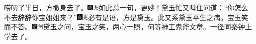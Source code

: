 唠叨了半日，方撤身去了。{\includegraphics[width=3mm]{../Images/00005}\includegraphics[width=3mm]{../Images/00012}\footnotesize \kaishu 如此总一句，更妙！}黛玉忙又叫住问道：“你怎么不去辞辞你宝姐姐来？”{\includegraphics[width=3mm]{../Images/00005}\includegraphics[width=3mm]{../Images/00012}\footnotesize \kaishu 必有是语，方是黛玉。此又系黛玉平生之病。}宝玉笑而不答。{\includegraphics[width=3mm]{../Images/00006}\includegraphics[width=3mm]{../Images/00011}\footnotesize \kaishu 黛玉之问，宝玉之笑，两心一照，何等神工鬼斧文章。}一径同秦钟上学去了。

